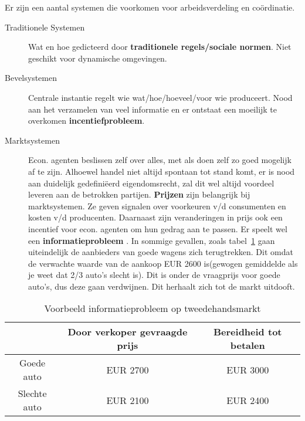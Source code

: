 Er zijn een aantal systemen die voorkomen voor arbeidsverdeling en co\"{o}rdinatie.
\begin{description}
	\item[Traditionele Systemen] Wat en hoe gedicteerd door \textbf{traditionele regels/sociale normen}. Niet geschikt voor dynamische omgevingen.
    \item[Bevelsystemen] Centrale instantie regelt wie wat/hoe/hoeveel/voor wie produceert. Nood aan het verzamelen van veel informatie en er ontstaat een moeilijk te overkomen \textbf{incentiefprobleem}.
    \item[Marktsystemen] Econ. agenten beslissen zelf over alles, met als doen zelf zo goed mogelijk af te zijn. Alhoewel handel niet  altijd spontaan tot stand komt, er is nood aan duidelijk gedefini\"{e}erd eigendomsrecht, zal dit wel altijd voordeel leveren aan de betrokken partijen. \textbf{Prijzen} zijn belangrijk bij marktsystemen. Ze geven signalen over voorkeuren v/d consumenten en kosten v/d producenten. Daarnaast zijn veranderingen in prijs ook een incentief voor econ. agenten om hun gedrag aan te passen. Er speelt wel een \textbf{informatieprobleem} . In sommige gevallen, zoals tabel~\ref{tab:tweedeHands} gaan uiteindelijk de aanbieders van goede wagens zich terugtrekken. Dit omdat de verwachte waarde van de aankoop EUR 2600 is(gewogen gemiddelde als je weet dat 2/3 auto's slecht is). Dit is onder de vraagprijs voor goede auto's, dus deze gaan verdwijnen. Dit herhaalt zich tot de markt uitdooft.
\end{description}
\begin{table}[h]
	\centering
    \begin{tabular}{ | c |  c |  c | }
		\hline
		& Door verkoper gevraagde prijs  &  Bereidheid tot betalen \\
		\hline
		 Goede auto & EUR 2700 & EUR 3000 \\
		\hline
		Slechte auto & EUR 2100 & EUR 2400\\
		\hline
	\end{tabular}
	\caption{Voorbeeld informatieprobleem op tweedehandsmarkt}
    \label{tab:tweedeHands}
\end{table}
